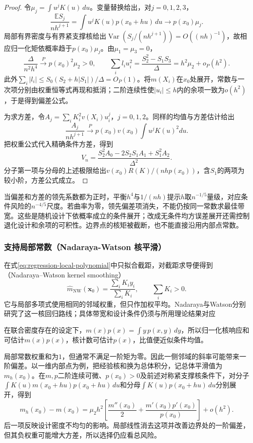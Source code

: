 \begin{proof}
令$\mu_j=\int u^jK(u)\,du$。变量替换给出，对$j=0,1,2,3$，
\[
  \frac{\mathbb{E}S_j}{nh^{j+1}}
  =\int u^jK(u)p(x_0+hu)\,du\longrightarrow p(x_0)\mu_j.
\]
局部有界密度与有界紧支撑核给出$\operatorname{Var}(S_j/(nh^{j+1}))=O((nh)^{-1})$，故相应归一化矩依概率趋于$p(x_0)\mu_j$。由$\mu_1=\mu_3=0$，
\[
  \frac{\Delta}{n^2h^4}\xrightarrow{P}p(x_0)^2\mu_2>0,\qquad
  \sum_i l_i u_i^2
    =\frac{S_2^2-S_1S_3}{\Delta}
    =h^2\mu_2+o_P(h^2).
\]
此外$\sum_i|l_i|\leq S_0(S_2+h|S_1|)/\Delta=O_P(1)$。将$m(X_i)$在$x_0$处展开，常数与一次项分别由权重恒等式再现和抵消；二阶连续性使$|u_i|\leq h$内的余项一致为$o(h^2)$，于是得到偏差公式。

为求方差，令$A_j=\sum_iK_i^2v(X_i)u_i^j$，$j=0,1,2$。同样的均值与方差估计给出
\[
  \frac{A_j}{nh^{j+1}}
    \xrightarrow{P}p(x_0)v(x_0)\int u^jK(u)^2du.
\]
把权重公式代入精确条件方差，得到
\[
  V_n=\frac{S_2^2A_0-2S_2S_1A_1+S_1^2A_2}{\Delta^2}.
\]
分子第一项与分母的上述极限给出$v(x_0)R(K)/(nhp(x_0))$，含$S_1$的两项为较小阶，方差公式成立。
\end{proof}

当偏差和方差的领先系数都为正时，平衡$h^4$与$1/(nh)$提示$h$取$n^{-1/5}$量级，对应条件风险的$n^{-4/5}$尺度。若曲率为零，领先偏差项消失，不能仍按同一常数求最佳带宽。这些是随机设计下依概率成立的条件展开；改成无条件均方误差展开还需控制退化设计和余项的可积性。边界点的核矩被截断，也不能直接沿用内部点常数。

\subsubsection{支持局部常数（Nadaraya-Watson 核平滑）}
\label{sec:regression-nadaraya-watson}

在式\eqref{eq:regression-local-polynomial}中只拟合截距，对截距求导便得到（Nadaraya--Watson kernel smoothing）
\begin{equation}
  \widehat m_{\mathrm{NW}}(\bm{x}_0)
  =\frac{\sum_iK_i y_i}{\sum_iK_i},
  \qquad \sum_iK_i>0.
  \label{eq:regression-nw}
\end{equation}
它与局部多项式使用相同的邻域权重，但只作加权平均。Nadaraya与Watson分别研究了这一核回归路线；具体带宽和设计条件仍须与所用理论结果对应

在联合密度存在的设定下，$m(x)p(x)=\int y\,p(x,y)\,dy$，所以归一化核响应和可估计$m(x)p(x)$，核计数可估计$p(x)$，比值便近似条件均值。

局部常数权重和为$1$，但通常不满足一阶矩为零。因此一侧邻域的斜率可能带来一阶偏差。以一维内部点为例，把经验核和换为总体积分，记总体平滑值为$m_h(x_0)$。在$m,p$二阶连续可微、$p(x_0)>0$及前述对称紧支撑核条件下，对分子$\int K(u)m(x_0+hu)p(x_0+hu)\,du$和分母$\int K(u)p(x_0+hu)\,du$分别展开，得到
\[
  m_h(x_0)-m(x_0)
  =\mu_2h^2\left[\frac{m''(x_0)}{2}
       +\frac{m'(x_0)p'(x_0)}{p(x_0)}\right]+o(h^2).
\]
后一项反映设计密度不均匀的影响。局部线性消去这项并改善边界处的一阶偏差，但其负权重可能增大方差，所以选择仍应看总风险。


